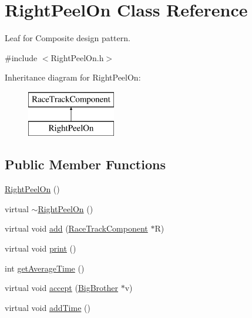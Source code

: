 \hypertarget{class_right_peel_on}{}\section{Right\+Peel\+On Class Reference}
\label{class_right_peel_on}


Leaf for Composite design pattern.  




{\ttfamily \#include $<$Right\+Peel\+On.\+h$>$}

Inheritance diagram for Right\+Peel\+On\+:\begin{figure}[H]
\begin{center}
\leavevmode
\includegraphics[height=2.000000cm]{class_right_peel_on}
\end{center}
\end{figure}
\subsection*{Public Member Functions}
\begin{DoxyCompactItemize}
\item 
\mbox{\hyperlink{class_right_peel_on_a99584752f686b5d5540b2a5a032248c1}{Right\+Peel\+On}} ()
\item 
virtual \mbox{\hyperlink{class_right_peel_on_a46a1e94121c8fb13ba7189e4d28c551f}{$\sim$\+Right\+Peel\+On}} ()
\item 
virtual void \mbox{\hyperlink{class_right_peel_on_a474f981bb38dda2758bf896cbf10545b}{add}} (\mbox{\hyperlink{class_race_track_component}{Race\+Track\+Component}} $\ast$R)
\item 
virtual void \mbox{\hyperlink{class_right_peel_on_a6c54c5dbffa104bb96e7b564e854dd74}{print}} ()
\item 
int \mbox{\hyperlink{class_right_peel_on_afdfcc99fb52dfc8363ec063083f1ba1d}{get\+Average\+Time}} ()
\item 
virtual void \mbox{\hyperlink{class_right_peel_on_a520a4959ff33775e8c188423b7bc01b7}{accept}} (\mbox{\hyperlink{class_big_brother}{Big\+Brother}} $\ast$v)
\item 
virtual void \mbox{\hyperlink{class_right_peel_on_aa37e19baf0ca3763e1912f85cbb0949b}{add\+Time}} ()
\end{DoxyCompactItemize}
